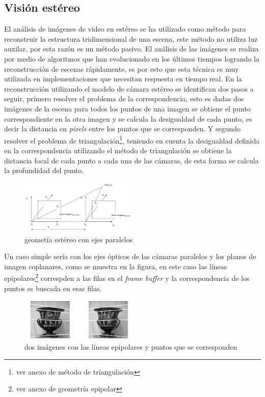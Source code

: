 \subsection{Visión estéreo}

\cite {StereoReview} El análisis de imágenes de video en estéreo se ha utilizado como método para reconstruir la estructura tridimensional de una escena, este método no utiliza luz auxilar, por esta razón es un método pasivo. El análisis de las imágenes se realiza por medio de algoritmos que han evolucionado en los últimos tiempos logrando la reconstrucción de escenas rápidamente, es por esto que esta técnica es muy utilizada en implementaciones que necesitan respuesta en tiempo real.
En la reconstrucción utilizando el modelo de cámara estéreo se identifican dos pasos a seguir, primero resolver el problema de la correspondencia, esto es dadas dos imágenes de la escena para todos los puntos de una imagen se obtiene el punto correspondiente en la otra imagen y se calcula la desigualdad de cada punto, es decir la distancia en \emph{pixels} entre los puntos que se corresponden.
Y segundo resolver el problema de triangulación\footnote{ver anexo de método de triangulación}, teniendo en cuenta la desigualdad definida en la correspondencia utilizando el método de triangulación se obtiene la distancia focal de cada punto a cada una de las cámaras, de esta forma se calcula la profundidad del punto.
\begin{figure}[H]
  \centering
    \includegraphics[width=0.5\textwidth]{./Cap6_reconstruccion/stereo.PNG}
  \caption{geometía estéreo con ejes paralelos}%
  \label{fig:Stereo}
\end{figure}
Un caso simple sería con los ejes ópticos de las cámaras paralelos y los planos de imagen coplanares, como se muestra en la figura, en este caso las líneas epipolares\footnote{ver anexo de geometría epipolar} correspden a las filas en el \emph{frame buffer} y la correspondencia de los puntos es buscada en esas filas.
\begin{figure}[H]
  \centering
    \includegraphics[width=0.5\textwidth]{./Cap6_reconstruccion/epipolar3.PNG}
  \caption{dos imágenes con las líneas epipolares y puntos que se corresponden}%
  \label{fig:Stereo2}
\end{figure}


